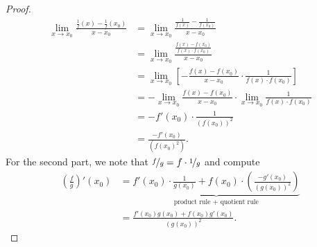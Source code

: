 \documentclass{article}
\newcommand{\?}{\stackrel{?}{=}}
\theoremstyle{definition} %
\begin{document}
\begin{itemize}
\begin{proof}
\begin{align*}
            \lim_{x \to x_0} \frac{\frac{1}{f}(x) - \frac{1}{f}(x_0)}{x - x_0} &= \lim_{x \to x_0} \frac{\frac{1}{f(x)} - \frac{1}{f(x_0)}}{x - x_0} \\
            &= \lim_{x \to x_0} \frac{\frac{f(x) - f(x_0)}{f(x) \cdot f(x_0)}}{x - x_0} \\
            &= \lim_{x \to x_0} \left[- \frac{f(x) - f(x_0)}{x - x_0} \cdot \frac{1}{f(x) \cdot f(x_0)}\right] \\
            &= - \lim_{x \to x_0} \frac{f(x) - f(x_0)}{x - x_0} \cdot \lim_{x \to x_0} \frac{1}{f(x) \cdot f(x_0)} \\
            &= -f'(x_0) \cdot \frac{1}{(f(x_0))^2} \\
            &= \frac{-f'(x_0)}{(f(x_0)^2)}.
        \end{align*}
        For the second part, we note that $\nicefrac{f}{g} = f \cdot \nicefrac{1}{g}$ and compute
        \begin{align*}
            \left(\frac{f}{g}\right)'(x_0) &= \underbrace{f'(x_0) \cdot \frac{1}{g(x_0)} + f(x_0) \cdot \left(\frac{-g'(x_0)}{(g(x_0))^2}\right)}_{\text{product rule + quotient rule}} \\
            &= \frac{f'(x_0)g(x_0) + f(x_0)g'(x_0)}{(g(x_0))^2}.
        \end{align*}
    \end{proof}
\end{itemize}

\newpage

\listoftheorems[]
\end{document}
